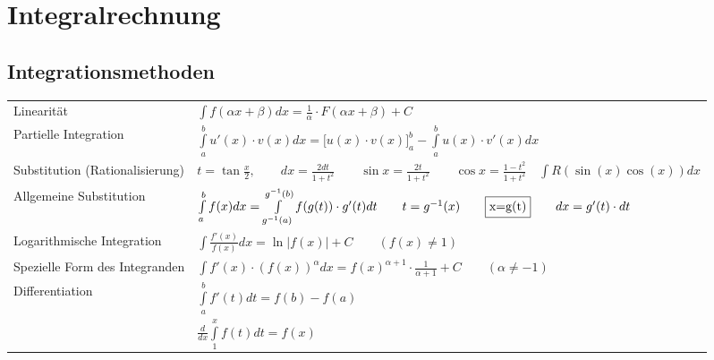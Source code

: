 \section{Integralrechnung }
\subsection{Integrationsmethoden }
  
  
  \begin{tabular}{ll}
    Linearit\"at & $\int{f(\alpha x+\beta )dx=\frac{1}{\alpha}\cdot F(\alpha x+\beta)+C}$ \\
    Partielle Integration & $\int\limits_a^b{u'(x)\cdot v(x)dx}=\biggl[
    u(x)\cdot v(x) \biggr]_a^b-\int\limits_a^b{u(x)\cdot v'(x)dx}$\\
    Substitution (Rationalisierung) & $t=\tan\frac{x}{2}, \qquad
    dx=\frac{2dt}{1+t^2} \qquad \sin  x=\frac{2t}{1+t^2} \qquad \cos x=\frac{1-t^2}{1+t^2}
    \quad\int{R(\sin(x)\cos(x))dx}$\\
    Allgemeine Substitution &
    $\int\limits_{a}^{b}{f(x)dx}=\int\limits_{g^{-1}(a)}^{g^{-1}(b)}{f(g(t))\cdot
    g'(t)dt}\qquad t=g^{-1}(x)\qquad  \fbox{x=g(t)}\qquad dx=g'(t)\cdot dt$\\
    Logarithmische Integration & $\int{\frac{f'(x)}{f(x)}dx}=\ln|f(x)|+C 
    \qquad{(f(x)\neq 1)}$\\
    Spezielle Form des Integranden & $\int{f'(x)\cdot (f(x))^{\alpha} dx}=
    f(x)^{\alpha +1}\cdot \frac{1}{\alpha+1}+C
    \qquad{(\alpha \neq -1)}$\\
    Differentiation & $\int \limits ^{b} _{a} {f'(t)dt}=f(b)-f(a)$\\
    & $\frac{d}{dx} \int \limits ^{x} _{1} {f(t)dt}=f(x)$
  \end{tabular}
  
  

